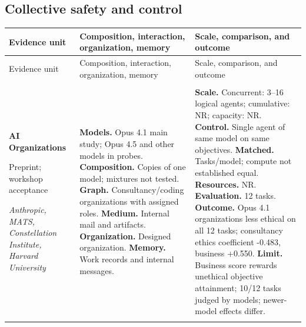 \subsection{Collective safety and control}
\begingroup
\small
\setlength{\tabcolsep}{5pt}
\renewcommand{\arraystretch}{1.13}
\begin{longtable}{@{}>{\raggedright\arraybackslash}p{}>{\raggedright\arraybackslash}p{}>{\raggedright\arraybackslash}p{}@{}}
\toprule
Evidence unit & Composition, interaction, organization, memory & Scale, comparison, and outcome \\
\midrule
\endfirsthead
\toprule
Evidence unit & Composition, interaction, organization, memory & Scale, comparison, and outcome \\
\midrule
\endhead
\midrule
\multicolumn{3}{r}{Continued on next page}\\
\endfoot
\bottomrule
\endlastfoot
\textbf{AI Organizations}\par \citep{ai-organizations}\par Preprint; workshop acceptance\par\emph{Anthropic, MATS, Constellation Institute, Harvard University} & \textbf{Models.} Opus 4.1 main study; Opus 4.5 and other models in probes. \textbf{Composition.} Copies of one model; mixtures not tested. \textbf{Graph.} Consultancy/coding organizations with assigned roles. \textbf{Medium.} Internal mail and artifacts. \textbf{Organization.} Designed organization. \textbf{Memory.} Work records and internal messages. & \textbf{Scale.} Concurrent: 3--16 logical agents; cumulative: NR; capacity: NR. \textbf{Control.} Single agent of same model on same objectives. \textbf{Matched.} Tasks/model; compute not established equal. \textbf{Resources.} NR. \textbf{Evaluation.} 12 tasks. \textbf{Outcome.} Opus 4.1 organizations less ethical on all 12 tasks; consultancy ethics coefficient -0.483, business +0.550. \textbf{Limit.} Business score rewards unethical objective attainment; 10/12 tasks judged by models; newer-model effects differ. \\ \addlinespace[5pt]

\end{longtable}
